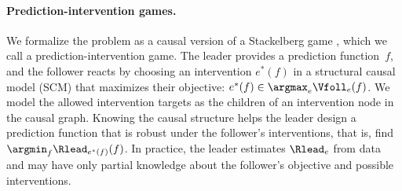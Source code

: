 \paragraph{Prediction-intervention games.}
We formalize the problem as a causal version of a Stackelberg game \citep{stackelbergMarktformGleichgewicht1934}, which we call a prediction-intervention game.
The leader provides a prediction
function~$f$, and the follower reacts by choosing an intervention $e^*(f)$
in a structural causal model (SCM) that maximizes their objective:
$e^*(f) \in \argmax_{e} \Vfoll_e(f)$. We model the allowed intervention targets as the children of an intervention node in the causal graph. Knowing the causal structure helps the leader design a prediction function
that is robust under the follower's interventions, that is, find $\argmin_{f} \Rlead_{e^*(f)}(f)$. 
In practice, the leader estimates $\Rlead_{e}$ from data and may have only partial knowledge about the follower's objective and possible interventions.



